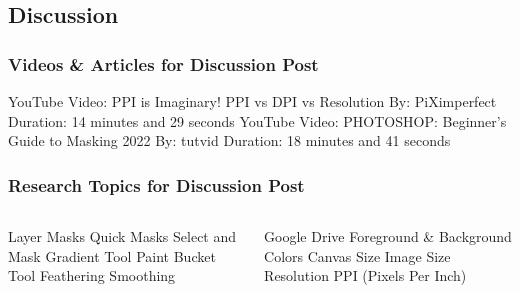 \documentclass{beamer}
\begin{document}
			\subsection{Discussion}		
				\begin{frame}
					\frametitle{Videos \& Articles for Discussion Post}
					\begin{outline}
						\1 YouTube Video:  PPI is Imaginary! PPI vs DPI vs Resolution
							\2 By:  PiXimperfect
							\2 Duration:  14 minutes and 29 seconds
						\1 YouTube Video:  PHOTOSHOP: Beginner’s Guide to Masking 2022
							\2 By:  tutvid
							\2 Duration:  18 minutes and 41 seconds
					\end{outline}
					
				\end{frame}

				\begin{frame}
					\frametitle{Research Topics for Discussion Post}
					\begin{columns}
						\column{.5\textwidth}
						\begin{outline}
							\1 Layer Masks
							\1 Quick Masks
							\1 Select and Mask
							\1 Gradient Tool
							\1 Paint Bucket Tool
							\1 Feathering
							\1 Smoothing
						\end{outline}
						\column{.5\textwidth}
					\begin{outline}
						\1 Google Drive
						\1 Foreground \& Background Colors
						\1 Canvas Size
						\1 Image Size
						\1 Resolution
						\1 PPI (Pixels Per Inch)
					\end{outline}
					\end{columns}
				\end{frame}
	
	\section{}	
\end{document}
